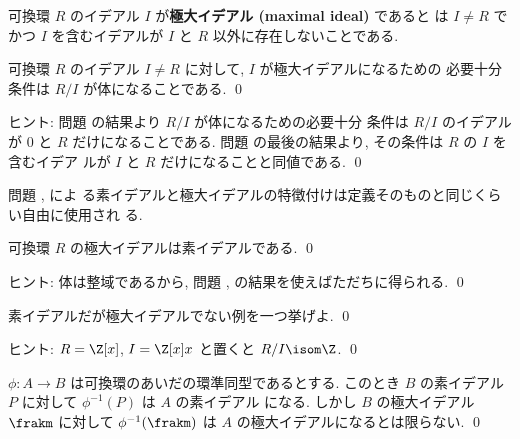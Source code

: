 \documentclass[12pt,twoside]{jarticle}
\begin{document}
\medskip

可換環 $R$ のイデアル $I$ が{\bf 極大イデアル (maximal ideal)} であると
は $I\ne R$ でかつ $I$ を含むイデアルが $I$ と $R$ 以外に存在しないことである. 

\begin{question}[それで割って体になるのが極大イデアル]
\label{q:maximal-ideal-field}
  可換環 $R$ のイデアル $I\ne R$ に対して, $I$ が極大イデアルになるための
  必要十分条件は $R/I$ が体になることである. 
  \qed
\end{question}

\noindent
ヒント: 問題  の結果より $R/I$ が体になるための必要十分
条件は $R/I$ のイデアルが $0$ と $R$ だけになることである.
問題  の最後の結果より, その条件は $R$ の $I$ を含むイデア
ルが $I$ と $R$ だけになることと同値である. 
\qed

\medskip

問題 ,  によ
る素イデアルと極大イデアルの特徴付けは定義そのものと同じくらい自由に使用され
る.


\begin{question}[極大ならば素]
\label{q:maximal-implies-prime}
  可換環 $R$ の極大イデアルは素イデアルである. \qed
\end{question}

\noindent
ヒント: 体は整域であるから, 
問題 ,
 の結果を使えばただちに得られる.
\qed


\begin{question}
  素イデアルだが極大イデアルでない例を一つ挙げよ. \qed
\end{question}

\noindent
ヒント: $R=\Z[x]$, $I=\Z[x]x$ と置くと $R/I\isom\Z$. \qed


\begin{question}
\label{q:Spec-mSpec}
  $\phi:A\to B$ は可換環のあいだの環準同型であるとする.
  このとき $B$ の素イデアル $P$ に対して $\phi^{-1}(P)$ は $A$ の素イデアル
  になる.  しかし $B$ の極大イデアル $\frakm$ に対して $\phi^{-1}(\frakm)$ 
  は $A$ の極大イデアルになるとは限らない.
  \qed
\end{question}
\end{document}
